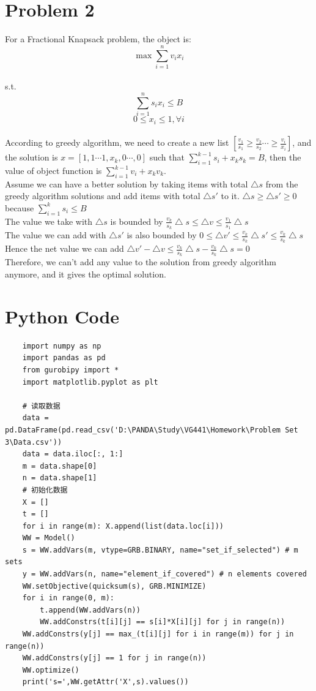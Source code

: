 \documentclass[a4paper]{article}
\begin{document}
\section{Problem 2}
For a Fractional Knapsack problem, the object is:
$$\max\sum_{i=1}^{n}v_i x_i$$
\\s.t.
$$\sum_{i=1}^{n}s_i x_i\leq B$$
$$0\leq x_i\leq 1,\forall i$$
\\According to greedy algorithm, we need to create a new list  $[\frac{v_1}{s_1}\geq \frac{v_2}{s_2}\cdots\geq \frac{v_i}{x_i}]$, and the solution is $x=[1, 1\cdots 1,x_k,0\cdots,0]$ such that $\sum_{i=1}^{k-1}s_i + x_ks_k=B$, then the value of object function is $\sum_{i=1}^{k-1}v_i + x_kv_k$.
\\Assume we can have a better solution by taking items with total $\bigtriangleup s$ from the greedy algorithm solutions and add items with total $\bigtriangleup s'$ to it. $\bigtriangleup s\geq\bigtriangleup s'\geq 0$ because $\sum_{i=1}^k s_i\leq B$
\\The value we take with $\bigtriangleup s$ is bounded by $\frac{v_k}{s_k}\bigtriangleup s\leq\bigtriangleup v\leq \frac{v_1}{s_1}\bigtriangleup s$
\\The value we can add with $\bigtriangleup s'$ is also bounded by $0\leq\bigtriangleup v'\leq \frac{v_k}{s_k}\bigtriangleup s'\leq \frac{v_k}{s_k}\bigtriangleup s$
\\Hence the net value we can add $\bigtriangleup v'-\bigtriangleup v\leq\frac{v_k}{s_k}\bigtriangleup s-\frac{v_k}{s_k}\bigtriangleup s=0$
\\Therefore, we can't add any value to the solution from greedy algorithm anymore, and it gives the optimal solution.
\newpage
\section*{Python Code}
\begin{verbatim}
    import numpy as np
    import pandas as pd
    from gurobipy import *
    import matplotlib.pyplot as plt

    # 读取数据
    data = pd.DataFrame(pd.read_csv('D:\PANDA\Study\VG441\Homework\Problem Set 3\Data.csv'))
    data = data.iloc[:, 1:]
    m = data.shape[0]
    n = data.shape[1]
    # 初始化数据
    X = []
    t = []
    for i in range(m): X.append(list(data.loc[i])) 
    WW = Model()
    s = WW.addVars(m, vtype=GRB.BINARY, name="set_if_selected") # m sets
    y = WW.addVars(n, name="element_if_covered") # n elements covered
    WW.setObjective(quicksum(s), GRB.MINIMIZE)
    for i in range(0, m):
        t.append(WW.addVars(n))
        WW.addConstrs(t[i][j] == s[i]*X[i][j] for j in range(n))
    WW.addConstrs(y[j] == max_(t[i][j] for i in range(m)) for j in range(n))
    WW.addConstrs(y[j] == 1 for j in range(n))
    WW.optimize()
    print('s=',WW.getAttr('X',s).values())
\end{verbatim}
\end{document}
